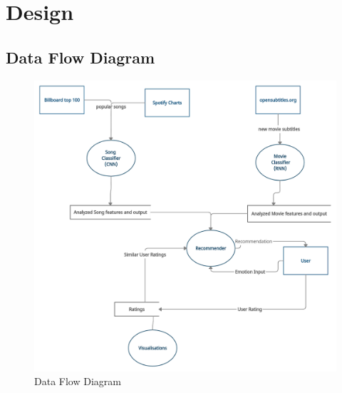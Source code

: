 \chapter{Design}
\section{Data Flow Diagram}

\begin{figure}[H]
\centering
\includegraphics[scale=0.19]{imgs/dataFlowDiagram.png}
\caption{Data Flow Diagram}
\label{fig: data flow diagram}
\end{figure}

